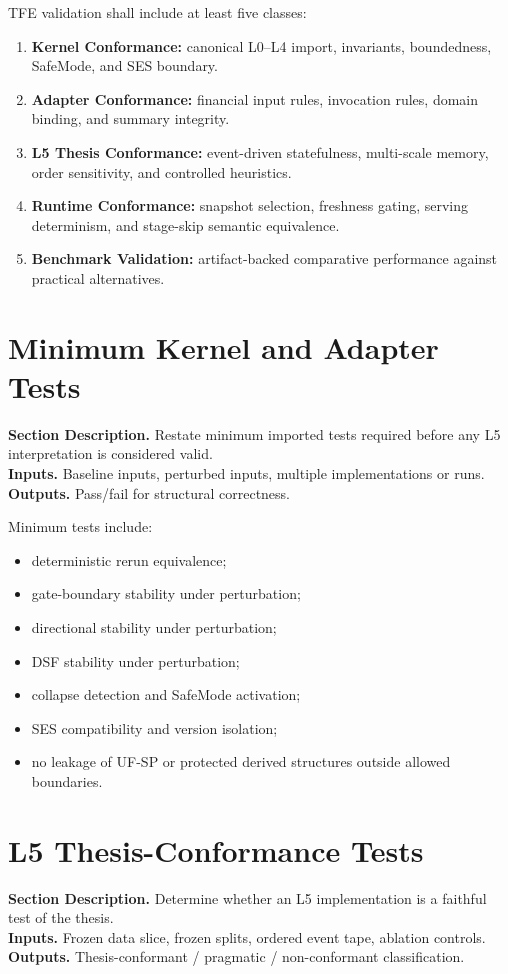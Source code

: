 \documentclass[11pt]{report}
\newcommand{\meta}[3]{\textbf{Section Description.} #1\\
\textbf{Inputs.} #2\\
\textbf{Outputs.} #3\par}
\begin{document}
TFE validation shall include at least five classes:
\begin{enumerate}[leftmargin=1.2cm]
    \item \textbf{Kernel Conformance:} canonical L0--L4 import, invariants, boundedness, SafeMode, and SES boundary.
    \item \textbf{Adapter Conformance:} financial input rules, invocation rules, domain binding, and summary integrity.
    \item \textbf{L5 Thesis Conformance:} event-driven statefulness, multi-scale memory, order sensitivity, and controlled heuristics.
    \item \textbf{Runtime Conformance:} snapshot selection, freshness gating, serving determinism, and stage-skip semantic equivalence.
    \item \textbf{Benchmark Validation:} artifact-backed comparative performance against practical alternatives.
\end{enumerate}

\section{Minimum Kernel and Adapter Tests}
\meta{Restate minimum imported tests required before any L5 interpretation is considered valid.}{Baseline inputs, perturbed inputs, multiple implementations or runs.}{Pass/fail for structural correctness.}

Minimum tests include:
\begin{itemize}
    \item deterministic rerun equivalence;
    \item gate-boundary stability under perturbation;
    \item directional stability under perturbation;
    \item DSF stability under perturbation;
    \item collapse detection and SafeMode activation;
    \item SES compatibility and version isolation;
    \item no leakage of UF-SP or protected derived structures outside allowed boundaries.
\end{itemize}

\section{L5 Thesis-Conformance Tests}
\meta{Determine whether an L5 implementation is a faithful test of the thesis.}{Frozen data slice, frozen splits, ordered event tape, ablation controls.}{Thesis-conformant / pragmatic / non-conformant classification.}
\end{document}
